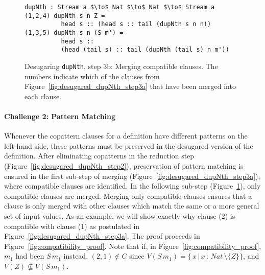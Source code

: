 \begin{figure}[h]
\begin{lstlisting}[mathescape]
dupNth : Stream a $\to$ Nat $\to$ Nat $\to$ Stream a
(1,2,4) dupNth s n Z = 
          head s :: (head s :: tail (dupNth s n n))
(1,3,5) dupNth s n (S m') = 
          head s :: 
          (head (tail s) :: tail (dupNth (tail s) n m'))
\end{lstlisting}
  \caption{Desugaring \texttt{dupNth}, step 3b: Merging compatible
    clauses. The numbers indicate which of the clauses from
    Figure~\ref{fig:desugared_dupNth_step3a} that have been merged into each clause.}
  \label{fig:desugared_dupNth_step3b}
\end{figure}

\paragraph{Challenge 2: Pattern Matching}
Whenever the copattern clauses for a definition have different patterns on the
left-hand side, these patterns must be preserved in the desugared version of the
definition. After eliminating copatterns in the reduction step
(Figure~\ref{fig:desugared_dupNth_step2}), preservation of pattern matching is
ensured in the first sub-step of merging
(Figure~\ref{fig:desugared_dupNth_step3a}), where compatible clauses are
identified. In the following sub-step (Figure~\ref{fig:desugared_dupNth_step3b}), only compatible clauses are
merged. Merging only compatible clauses ensures that a clause is only merged
with other clauses which match the same or a more general set of input values. As an example, we will show exactly why clause (2) is compatible
with clause (1) as postulated in
Figure~\ref{fig:desugared_dupNth_step3a}. The proof
proceeds in Figure~\ref{fig:compatibility_proof}. Note that if, in Figure~\ref{fig:compatibility_proof}, $m_{1}$ had been
$S\,m_{1}$ instead, $(2,1)\notin C$ since $V(S\,m_{1}) =
\{\,x\,|\,x\,:\,Nat\,\setminus\{Z\}\}$, and $V(Z)\not\subseteq V(S\,m_{1})$.

